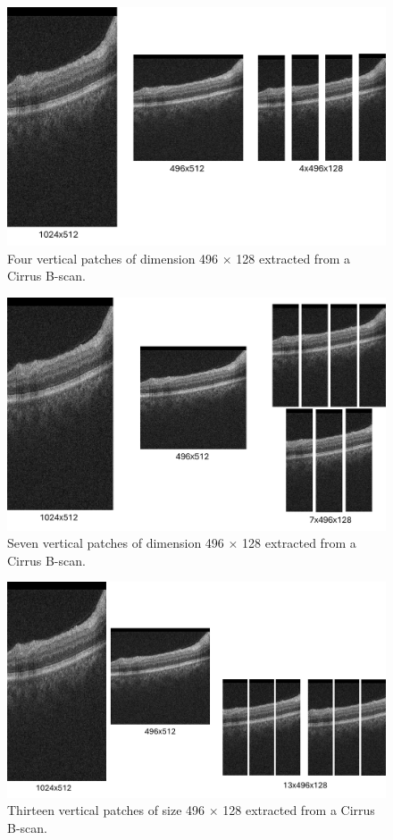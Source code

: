 \begin{figure}[!ht]
	\centering
	\includegraphics[width=0.65\linewidth]{figures/CirrusFourPatchExtraction.png}
	\caption{Four vertical patches of dimension 496 $\times$ 128 extracted from a Cirrus B-scan.}
	\label{fig:CirrusFourPatchExtraction}
\end{figure}

\begin{figure}[!ht]
	\centering
	\includegraphics[width=0.65\linewidth]{figures/CirrusSevenPatchExtraction.png}
	\caption{Seven vertical patches of dimension 496 $\times$ 128 extracted from a Cirrus B-scan.}
	\label{fig:CirrusSevenPatchExtraction}
\end{figure}

\begin{figure}[!ht]
	\centering
	\includegraphics[width=0.75\linewidth]{figures/CirrusThirteenPatchExtraction.png}
	\caption{Thirteen vertical patches of size 496 $\times$ 128 extracted from a Cirrus B-scan.}
	\label{fig:CirrusThirteenPatchExtraction}
\end{figure}

